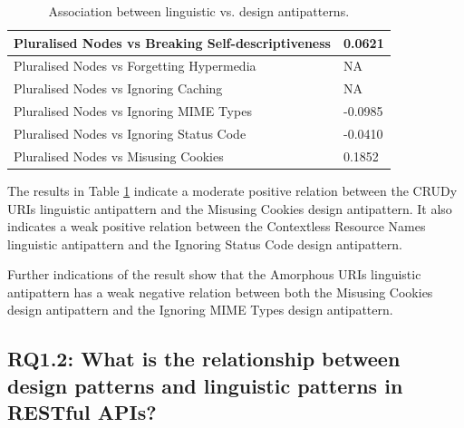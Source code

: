 \documentclass[a4paper,12pt]{article}
\begin{document}
\begin{table}[ht!]
\begin{tabular}{|p{90mm}|p{50mm}|}
\\ \hline
Pluralised Nodes vs Breaking Self-descriptiveness & 0.0621
\\ \hline
Pluralised Nodes vs Forgetting Hypermedia & NA
\\ \hline
Pluralised Nodes vs Ignoring Caching & NA
\\ \hline
Pluralised Nodes vs Ignoring MIME Types & -0.0985
\\ \hline
Pluralised Nodes vs Ignoring Status Code & -0.0410
\\ \hline
Pluralised Nodes vs Misusing Cookies & 0.1852
\\ \hline
    \end{tabular}
    \caption{Association between linguistic vs. design antipatterns.}
    \label{tab:Linguistic vs design antipatterns}
\end{table}

\clearpage

The results in Table \ref{tab:Linguistic vs design antipatterns} indicate a moderate positive relation between the  CRUDy URIs linguistic antipattern and the  Misusing Cookies design antipattern. It also indicates a weak positive relation between the  Contextless Resource Names linguistic antipattern and the  Ignoring Status Code design antipattern. 

Further indications of the result show that the  Amorphous URIs linguistic antipattern has a weak negative relation between both the  Misusing Cookies design antipattern and the Ignoring MIME Types design antipattern. 

\subsection{\textbf{RQ1.2:} What is the relationship between design patterns and linguistic patterns in RESTful APIs?}
\end{document}
